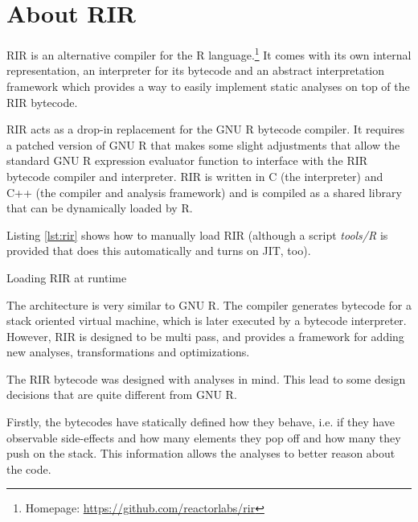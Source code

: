 \chapter{About RIR\label{rir}}

RIR is an alternative compiler for the R language.\footnote{Homepage: \url{https://github.com/reactorlabs/rir}} It comes with its own internal representation, an interpreter for its bytecode and an abstract interpretation framework which provides a way to easily implement static analyses on top of the RIR bytecode.

RIR acts as a drop-in replacement for the GNU R bytecode compiler. It requires a patched version of GNU R that makes some slight adjustments that allow the standard GNU R expression evaluator function to interface with the RIR bytecode compiler and interpreter. RIR is written in C (the interpreter) and C++ (the compiler and analysis framework) and is compiled as a shared library that can be dynamically loaded by R.

Listing \ref{lst:rir} shows how to manually load RIR (although a script \emph{tools/R} is provided that does this automatically and turns on JIT, too).

\begin{listing}[htbp]
  \caption{\label{lst:rir}Loading RIR at runtime}
  \begin{rcode}
> dyn.load("~/rir/build/librir.so")  # path to the shared object
> source("~/rir/rir/R/rir.R")  # load the API for RIR compiler
> # RIR is now ready:
> f <- rir.compile(function() {})
> f
function() {}
<bytecode: 0x34b4510>
> rir.disassemble(f)
0x2f80538
   guard_fun_  { == 0x2077cd8
   push_  23 # NULL
   ret_ 
  \end{rcode}
\end{listing}

The architecture is very similar to GNU R. The compiler generates bytecode for a stack oriented virtual machine, which is later executed by a bytecode interpreter. However, RIR is designed to be multi pass, and provides a framework for adding new analyses, transformations and optimizations.

The RIR bytecode was designed with analyses in mind. This lead to some design decisions that are quite different from GNU R.

Firstly, the bytecodes have statically defined how they behave, i.e. if they have observable side-effects and how many elements they pop off and how many they push on the stack. This information allows the analyses to better reason about the code.

